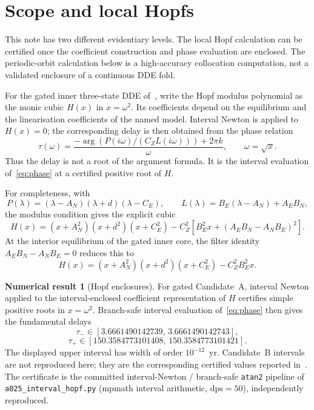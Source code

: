 \documentclass[11pt]{article}
\theoremstyle{definition}
\newtheorem{numresult}{Numerical result}
\begin{document}
\section{Scope and local Hopfs}

This note has two different evidentiary levels. The local Hopf calculation can be certified once the coefficient construction and phase evaluation are enclosed. The periodic-orbit calculation below is a high-accuracy collocation computation, not a validated enclosure of a continuous DDE fold.

For the gated inner three-state DDE of~\cite{paperI}, write the Hopf modulus polynomial as the monic cubic $H(x)$ in $x=\omega^2$. Its coefficients depend on the equilibrium and the linearisation coefficients of the named model. Interval Newton is applied to $H(x)=0$; the corresponding delay is then obtained from the phase relation
\begin{equation}
\tau(\omega)=
\frac{-\arg\!\left(P(i\omega)/(C_ZL(i\omega))\right)+2\pi k}{\omega},
\qquad \omega=\sqrt{x}.
\label{eq:phase}
\end{equation}
Thus the delay is not a root of the argument formula. It is the interval evaluation of~\eqref{eq:phase} at a certified positive root of $H$.

For completeness, with
\[
P(\lambda)=(\lambda-A_N)(\lambda+d)(\lambda-C_E),
\qquad
L(\lambda)=B_E(\lambda-A_N)+A_EB_N,
\]
the modulus condition gives the explicit cubic
\begin{equation}
H(x)=(x+A_N^2)(x+d^2)(x+C_E^2)
-C_Z^2\left[B_E^2x+(A_EB_N-A_NB_E)^2\right].
\label{eq:hopf-cubic}
\end{equation}
At the interior equilibrium of the gated inner core, the filter identity
$A_EB_N-A_NB_E=0$ reduces this to
\[
H(x)=(x+A_N^2)(x+d^2)(x+C_E^2)-C_Z^2B_E^2x.
\]

\begin{numresult}[Hopf enclosures]
\label{num:H}
For gated Candidate~A, interval Newton applied to the interval-enclosed coefficient representation of $H$ certifies simple positive roots in $x=\omega^2$. Branch-safe interval evaluation of~\eqref{eq:phase} then gives the fundamental delays
\[
\tau_-\in[3.6661490142739,\,3.6661490142743],
\]
\[
\tau_+\in[150.3584773101408,\,150.3584773101421].
\]
The displayed upper interval has width of order $10^{-12}$~yr. Candidate~B intervals are not reproduced here; they are the corresponding certified values reported in~\cite{paperI}. The certificate is the committed interval-Newton / branch-safe \texttt{atan2} pipeline of \texttt{a025\_interval\_hopf.py} (mpmath interval arithmetic, $\mathrm{dps}=50$), independently reproduced.
\end{numresult}
\end{document}

